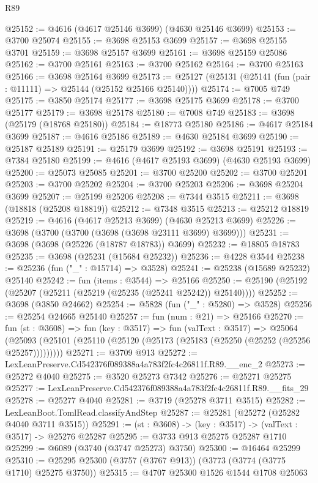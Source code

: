 \begin{lexlean}{R89}
\begin{coremodule}
@25152 := @4616 (@4617 @25146 @3699) (@4630 @25146 @3699)
@25153 := @3700 @25074
@25155 := @3698 @25153 @3699
@25157 := @3698 @25155 @3701
@25159 := @3698 @25157 @3699
@25161 := @3698 @25159 @25086
@25162 := @3700 @25161
@25163 := @3700 @25162
@25164 := @3700 @25163
@25166 := @3698 @25164 @3699
@25173 := @25127 (@25131 (@25141 (fun (pair : @11111) => @25144 (@25152 @25166 @25140))))
@25174 := @7005 @749
@25175 := @3850 @25174
@25177 := @3698 @25175 @3699
@25178 := @3700 @25177
@25179 := @3698 @25178
@25180 := @7008 @749
@25183 := @3698 (@25179 (@18768 @25180))
@25184 := @18773 @25180
@25186 := @4617 @25184 @3699
@25187 := @4616 @25186
@25189 := @4630 @25184 @3699
@25190 := @25187 @25189
@25191 := @25179 @3699
@25192 := @3698 @25191
@25193 := @7384 @25180
@25199 := @4616 (@4617 @25193 @3699) (@4630 @25193 @3699)
@25200 := @25073 @25085
@25201 := @3700 @25200
@25202 := @3700 @25201
@25203 := @3700 @25202
@25204 := @3700 @25203
@25206 := @3698 @25204 @3699
@25207 := @25199 @25206
@25208 := @7344 @3515
@25211 := @3698 (@18818 (@25208 @18819))
@25212 := @7348 @3515
@25213 := @25212 @18819
@25219 := @4616 (@4617 @25213 @3699) (@4630 @25213 @3699)
@25226 := @3698 (@3700 (@3700 (@3698 (@3698 @23111 @3699) @3699)))
@25231 := @3698 (@3698 (@25226 (@18787 @18783)) @3699)
@25232 := @18805 @18783
@25235 := @3698 (@25231 (@15684 @25232))
@25236 := @4228 @3544
@25238 := @25236 (fun ("_" : @15714) => @3528)
@25241 := @25238 (@15689 @25232) @25140
@25242 := fun (items : @3544) => @25166
@25250 := @25190 (@25192 (@25207 (@25211 (@25219 (@25235 (@25241 @25242)) @25140))))
@25252 := @3698 (@3850 @24662)
@25254 := @5828 (fun ("_" : @5280) => @3528)
@25256 := @25254 @24665 @25140
@25257 := fun (num : @21) => @25166
@25270 := fun (st : @3608) =>
  fun (key : @3517) =>
  fun (valText : @3517) =>
  @25064 (@25093 (@25101 (@25110 (@25120 (@25173 (@25183 (@25250 (@25252 (@25256 @25257)))))))))
@25271 := @3709 @913
@25272 := LexLeanPreserve.Cd542376f089388a4a783f2fc4c26811f.R89.__enc_2
@25273 := @25272 @4040
@25275 := @3520 @25273 @7342
@25276 := @25271 @25275
@25277 := LexLeanPreserve.Cd542376f089388a4a783f2fc4c26811f.R89.__fits_29
@25278 := @25277 @4040
@25281 := @3719 (@25278 @3711 @3515)
@25282 := LexLeanBoot.TomlRead.classifyAndStep
@25287 := @25281 (@25272 (@25282 @4040 @3711 @3515))
@25291 := (st : @3608) -> (key : @3517) -> (valText : @3517) -> @25276 @25287
@25295 := @3733 @913 @25275 @25287 @1710
@25299 := @6089 (@3740 (@3747 @25273) @3750)
@25300 := @16464 @25299
@25310 := @25295 @25300 (@3757 (@3767 @913)) (@3773 (@3774 (@3775 @1710) @25275 @3750))
@25315 := @4707 @25300 @1526 @1544 @1708 @25063

\end{coremodule}
\end{lexlean}
